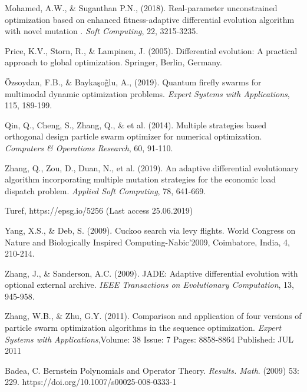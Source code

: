 \documentclass[preprint,10pt,3p]{elsarticle}
\begin{document}
\begin{thebibliography}{00}
 Mohamed, A.W., \& Suganthan P.N., (2018). Real-parameter unconstrained optimization based on enhanced fitness-adaptive differential evolution algorithm with novel mutation . \emph{Soft Computing}, 22, 3215-3235.

  Price, K.V., Storn, R.,  \& Lampinen, J. (2005). Differential evolution: A practical approach to global optimization. Springer, Berlin, Germany.

  \"{O}zsoydan, F.B., \& Bayka\c{s}o\~{g}lu, A., (2019). Quantum firefly swarms for multimodal dynamic optimization problems.  \emph{Expert Systems with Applications}, 115, 189-199.

  Qin, Q., Cheng, S., Zhang, Q., \& et al. (2014). Multiple strategies based orthogonal design particle swarm optimizer for numerical optimization. \emph{Computers \& Operations Research}, 60, 91-110.

 Zhang, Q., Zou, D., Duan, N., et al. (2019). An adaptive differential evolutionary algorithm incorporating multiple mutation strategies for the economic load dispatch problem. \emph{Applied Soft Computing}, 78, 641-669.

 Turef, https://epsg.io/5256 (Last access 25.06.2019)

 Yang, X.S., \& Deb, S. (2009). Cuckoo search via levy flights. World Congress on Nature and Biologically Inspired Computing-Nabic\textquoteright 2009, Coimbatore, India, 4, 210-214.

   Zhang, J., \& Sanderson, A.C. (2009). JADE: Adaptive differential evolution with optional external archive. \emph{IEEE Transactions on Evolutionary Computation},  13, 945-958.

  Zhang, W.B., \&  Zhu, G.Y. (2011). Comparison and application of four versions of particle swarm optimization algorithms in the sequence optimization. \emph{Expert Systems with Applications},Volume: 38   Issue: 7   Pages: 8858-8864   Published: JUL 2011

 Badea, C. Bernstein Polynomials and Operator Theory. \emph{Results. Math}. (2009) 53: 229. https://doi.org/10.1007/s00025-008-0333-1

\end{thebibliography}

 
\end{document}
